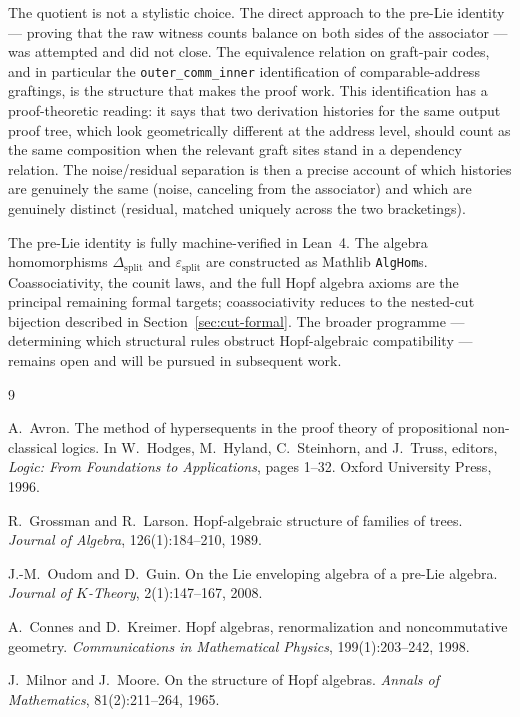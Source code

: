 \documentclass[11pt]{article}
\begin{document}
The quotient is not a stylistic choice. The direct approach to the pre-Lie
identity --- proving that the raw witness counts balance on both sides of the
associator --- was attempted and did not close. The equivalence relation on
graft-pair codes, and in particular the \texttt{outer\_comm\_inner} identification
of comparable-address graftings, is the structure that makes the proof work.
This identification has a proof-theoretic reading: it says that two derivation
histories for the same output proof tree, which look geometrically different at
the address level, should count as the same composition when the relevant graft
sites stand in a dependency relation. The noise/residual separation is then a
precise account of which histories are genuinely the same (noise, canceling from
the associator) and which are genuinely distinct (residual, matched uniquely
across the two bracketings).

The pre-Lie identity is fully machine-verified in Lean~4.  The algebra homomorphisms $\Delta_{\mathrm{split}}$ and $\varepsilon_{\mathrm{split}}$ are constructed as Mathlib \texttt{AlgHom}s.  Coassociativity, the counit laws, and the full Hopf algebra axioms are the principal remaining formal targets; coassociativity reduces to the nested-cut bijection described in Section~\ref{sec:cut-formal}.  The broader programme --- determining which structural rules obstruct Hopf-algebraic compatibility --- remains open and will be pursued in subsequent work.

\begin{thebibliography}{9}

A.~Avron.
\newblock The method of hypersequents in the proof theory of propositional
  non-classical logics.
\newblock In W.~Hodges, M.~Hyland, C.~Steinhorn, and J.~Truss, editors,
  \emph{Logic: From Foundations to Applications}, pages 1--32. Oxford University Press, 1996.

R.~Grossman and R.~Larson.
\newblock Hopf-algebraic structure of families of trees.
\newblock \emph{Journal of Algebra}, 126(1):184--210, 1989.

J.-M.~Oudom and D.~Guin.
\newblock On the Lie enveloping algebra of a pre-Lie algebra.
\newblock \emph{Journal of $K$-Theory}, 2(1):147--167, 2008.

A.~Connes and D.~Kreimer.
\newblock Hopf algebras, renormalization and noncommutative geometry.
\newblock \emph{Communications in Mathematical Physics}, 199(1):203--242, 1998.

J.~Milnor and J.~Moore.
\newblock On the structure of Hopf algebras.
\newblock \emph{Annals of Mathematics}, 81(2):211--264, 1965.

\end{thebibliography}
\end{document}
